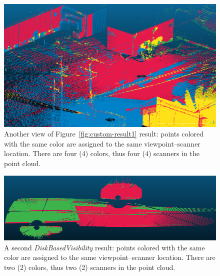 \begin{figure}
  \centering
  \includegraphics[scale=0.35]{img/custom-result2.png}
  \caption{Another view of Figure~\ref{fig:custom-result1} result: points colored with the same color are assigned to the same viewpoint--scanner location. There are four (4) colors, thus four (4) scanners in the point cloud.}
  \label{fig:custom-result2}
\end{figure}
\begin{figure}
  \centering
  \includegraphics[scale=0.35]{img/custom-result3.png}
  \caption{A second \emph{DiskBasedVisibility} result: points colored with the same color are assigned to the same viewpoint--scanner location. There are two (2) colors, thus two (2) scanners in the point cloud.}
  \label{fig:custom-result3}
\end{figure}
